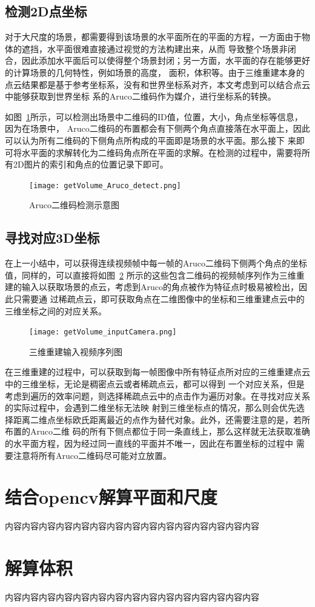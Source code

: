 \subsection{检测2D点坐标}
\label{sec:4.2.1}
对于大尺度的场景，都需要得到该场景的水平面所在的平面的方程，一方面由于物体的遮挡，水平面很难直接通过视觉的方法构建出来，从而
导致整个场景非闭合，因此添加水平面后可以使得整个场景封闭；另一方面，水平面的存在能够更好的计算场景的几何特性，例如场景的高度，
面积，体积等。由于三维重建本身的点云结果都是基于参考坐标系，没有和世界坐标系对齐，本文考虑到可以结合点云中能够获取到世界坐标
系的Aruco二维码作为媒介，进行坐标系的转换。

如图~\ref{fig:getVolume_Aruco_detect}所示，可以检测出场景中二维码的ID值，位置，大小，角点坐标等信息，因为在场景中，
Aruco二维码的布置都会有下侧两个角点直接落在水平面上，因此可以认为所有二维码的下侧角点所构成的平面即是场景的水平面。那么接下
来即可将水平面的求解转化为二维码角点所在平面的求解。在检测的过程中，需要将所有2D图片的索引和角点的位置记录下即可。

\begin{figure}[H] %
\centering
\texttt{[image: getVolume\_Aruco\_detect.png]}
\caption{Aruco二维码检测示意图}
\label{fig:getVolume_Aruco_detect}
\end{figure}

\subsection{寻找对应3D坐标}
\label{sec:4.2.2}
在上一小结中，可以获得连续视频帧中每一帧的Aruco二维码下侧两个角点的坐标值，同样的，可以直接将如图~\ref{fig:getVolume_inputCamera}
所示的这些包含二维码的视频帧序列作为三维重建的输入以获取场景的点云，考虑到Aruco的角点被作为特征点时极易被检出，因此只需要通
过稀疏点云，即可获取角点在二维图像中的坐标和三维重建点云中的三维坐标之间的对应关系。

\begin{figure}[H] %
  \centering
  \texttt{[image: getVolume\_inputCamera.png]}
  \caption{三维重建输入视频序列图}
  \label{fig:getVolume_inputCamera}
  \end{figure}
在三维重建的过程中，可以获取到每一帧图像中所有特征点所对应的三维重建点云中的三维坐标，无论是稠密点云或者稀疏点云，都可以得到
一个对应关系，但是考虑到遍历的效率问题，则选择稀疏点云中的点击作为遍历对象。在寻找对应关系的实际过程中，会遇到二维坐标无法映
射到三维坐标点的情况，那么则会优先选择距离二维点坐标欧氏距离最近的点作为替代对象。此外，还需要注意的是，若所布置的Aruco二维
码的所有下侧点都位于同一条直线上，那么这样就无法获取准确的水平面方程，因为经过同一直线的平面并不唯一，因此在布置坐标的过程中
需要注意将所有Aruco二维码尽可能对立放置。
\section{结合opencv解算平面和尺度}
\label{sec:4.3}
内容内容内容内容内容内容内容内容内容内容内容内容内容内容内容
\section{解算体积}
\label{sec:4.4}
内容内容内容内容内容内容内容内容内容内容内容内容内容内容内容


